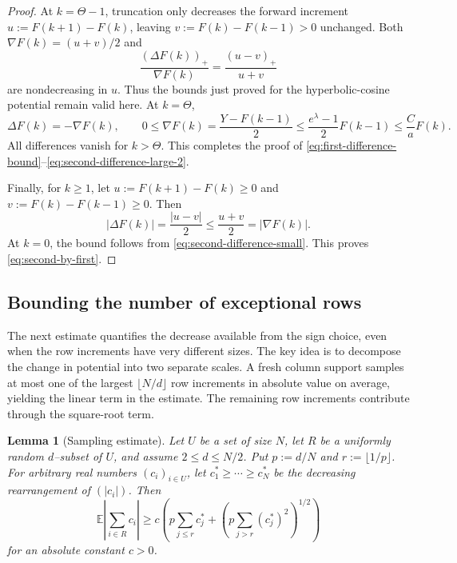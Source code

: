 \documentclass[reqno,english]{amsart}
\newcommand*{\EE}{\mathbb E}
\newtheorem{lemma}[lemma]{Lemma}
\theoremstyle{definition}
\begin{document}
\begin{proof}
At $k=\Theta-1$, truncation only decreases the forward increment
$u:=F(k+1)-F(k)$, leaving $v:=F(k)-F(k-1)>0$ unchanged.
Both $\nabla F(k)=(u+v)/2$ and
\[
 \frac{(\Delta F(k))_+}{\nabla F(k)}
 =\frac{(u-v)_+}{u+v}
\]
are nondecreasing in $u$. Thus the bounds just proved for the {\color{black}hyperbolic-cosine} potential remain valid here. At $k=\Theta$,
\[
 \Delta F(k)=-\nabla F(k),\qquad
 0\le\nabla F(k)=\frac{Y-F(k-1)}2
 \le\frac{e^\lambda-1}{2}F(k-1)\le\frac{C}{a}F(k).
\]
All differences vanish for $k>\Theta$. This completes the proof of
\eqref{eq:first-difference-bound}--\eqref{eq:second-difference-large-2}.


Finally, for $k\ge1$, let
$u:=F(k+1)-F(k)\ge0$ and $v:=F(k)-F(k-1)\ge0$.
Then
\[
 |\Delta F(k)|=\frac{|u-v|}{2}
 \le\frac{u+v}{2}=|\nabla F(k)|.
\]
At $k=0$, the bound follows from \eqref{eq:second-difference-small}.
This proves \eqref{eq:second-by-first}.
\end{proof}

\subsection{Bounding the number of exceptional rows}\label{sec:exceptional-count}


The next estimate quantifies the decrease available from the sign choice,
even when the row increments have very different sizes. The key idea is to decompose the change in potential into two separate scales. A fresh column support
samples at most one of the largest $\lfloor N/d\rfloor$ row increments in absolute value on
average, yielding the linear term in the estimate. The remaining row increments contribute through the square-root term.

\begin{lemma}[Sampling estimate]\label{lem:linear}
Let $U$ be a set of size $N$, let $R$ be a uniformly random $d$--subset of
$U$, and assume $2\le d\le N/2$.  Put $p:=d/N$ and
$r:=\lfloor1/p\rfloor$.  For arbitrary real numbers $(c_i)_{i\in U}$, let
$c_1^*\ge\cdots\ge c_N^*$ be the decreasing rearrangement of $(|c_i|)$.  Then
\begin{equation}\label{eq:linear-estimate}
 \EE\left|\sum_{i\in R}c_i\right|
 \ge c\left(
   p\sum_{j\le r}c_j^*
   +\left(p\sum_{j>r}(c_j^*)^2\right)^{1/2}
 \right)
\end{equation}
for an absolute constant $c>0$.
\end{lemma}
\end{document}
